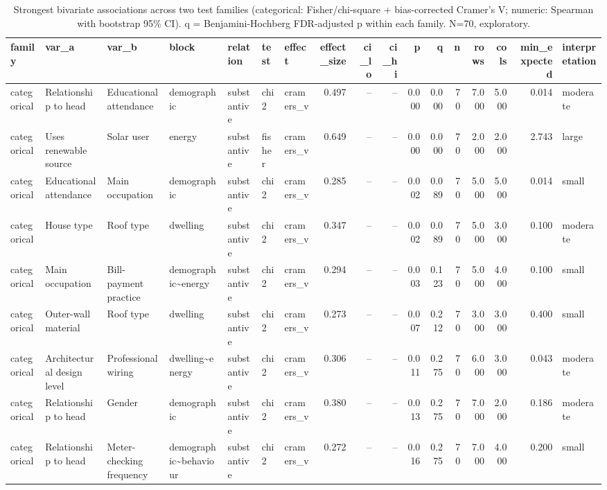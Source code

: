 \begin{table}
\caption{Strongest bivariate associations across two test families (categorical: Fisher/chi-square + bias-corrected Cramer's V; numeric: Spearman with bootstrap 95\% CI). q = Benjamini-Hochberg FDR-adjusted p within each family. N=70, exploratory.}
\label{tab:top_assoc}
\begin{tabular}{lllllllrrrrrrrrrl}
\toprule
family & var\_a & var\_b & block & relation & test & effect & effect\_size & ci\_lo & ci\_hi & p & q & n & rows & cols & min\_expected & interpretation \\
\midrule
categorical & Relationship to head & Educational attendance & demographic & substantive & chi2 & cramers\_v & 0.497 & -- & -- & 0.000 & 0.000 & 70 & 7.000 & 5.000 & 0.014 & moderate \\
categorical & Uses renewable source & Solar user & energy & substantive & fisher & cramers\_v & 0.649 & -- & -- & 0.000 & 0.000 & 70 & 2.000 & 2.000 & 2.743 & large \\
categorical & Educational attendance & Main occupation & demographic & substantive & chi2 & cramers\_v & 0.285 & -- & -- & 0.002 & 0.089 & 70 & 5.000 & 5.000 & 0.014 & small \\
categorical & House type & Roof type & dwelling & substantive & chi2 & cramers\_v & 0.347 & -- & -- & 0.002 & 0.089 & 70 & 5.000 & 3.000 & 0.100 & moderate \\
categorical & Main occupation & Bill-payment practice & demographic\textasciitilde energy & substantive & chi2 & cramers\_v & 0.294 & -- & -- & 0.003 & 0.123 & 70 & 5.000 & 4.000 & 0.100 & small \\
categorical & Outer-wall material & Roof type & dwelling & substantive & chi2 & cramers\_v & 0.273 & -- & -- & 0.007 & 0.212 & 70 & 3.000 & 3.000 & 0.400 & small \\
categorical & Architectural design level & Professional wiring & dwelling\textasciitilde energy & substantive & chi2 & cramers\_v & 0.306 & -- & -- & 0.011 & 0.275 & 70 & 6.000 & 3.000 & 0.043 & moderate \\
categorical & Relationship to head & Gender & demographic & substantive & chi2 & cramers\_v & 0.380 & -- & -- & 0.013 & 0.275 & 70 & 7.000 & 2.000 & 0.186 & moderate \\
categorical & Relationship to head & Meter-checking frequency & demographic\textasciitilde behaviour & substantive & chi2 & cramers\_v & 0.272 & -- & -- & 0.016 & 0.275 & 70 & 7.000 & 4.000 & 0.200 & small \\

\end{tabular}
\end{table}
